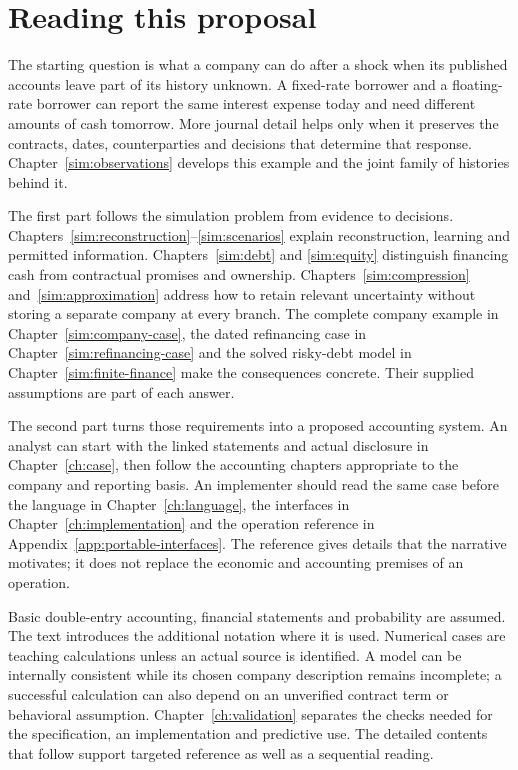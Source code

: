 \chapter*{Reading this proposal}
\label{sec:reading-guide}

The starting question is what a company can do after a shock when its published
accounts leave part of its history unknown. A fixed-rate borrower and a
floating-rate borrower can report the same interest expense today and need
different amounts of cash tomorrow. More journal detail helps only when it
preserves the contracts, dates, counterparties and decisions that determine
that response. Chapter~\ref{sim:observations} develops this example and the
joint family of histories behind it.

The first part follows the simulation problem from evidence to decisions.
Chapters~\ref{sim:reconstruction}--\ref{sim:scenarios} explain reconstruction,
learning and permitted information. Chapters~\ref{sim:debt} and
\ref{sim:equity} distinguish financing cash from contractual promises and
ownership. Chapters~\ref{sim:compression} and~\ref{sim:approximation} address
how to retain relevant uncertainty without storing a separate company at every
branch. The complete company example in Chapter~\ref{sim:company-case}, the
dated refinancing case in Chapter~\ref{sim:refinancing-case} and the solved
risky-debt model in Chapter~\ref{sim:finite-finance} make the consequences
concrete. Their supplied assumptions are part of each answer.

The second part turns those requirements into a proposed accounting system.
An analyst can start with the linked statements and actual disclosure in
Chapter~\ref{ch:case}, then follow the accounting chapters appropriate to the
company and reporting basis. An implementer should read the same case before
the language in Chapter~\ref{ch:language}, the interfaces in
Chapter~\ref{ch:implementation} and the operation reference in
Appendix~\ref{app:portable-interfaces}. The reference gives details that the
narrative motivates; it does not replace the economic and accounting premises
of an operation.

Basic double-entry accounting, financial statements and probability are assumed.
The text introduces the additional notation where it is used. Numerical cases
are teaching calculations unless an actual source is identified. A model can
be internally consistent while its chosen company description remains
incomplete; a successful calculation can also depend on an unverified contract
term or behavioral assumption. Chapter~\ref{ch:validation} separates the
checks needed for the specification, an implementation and predictive use.
The detailed contents that follow support targeted reference as well as a
sequential reading.
\clearpage
